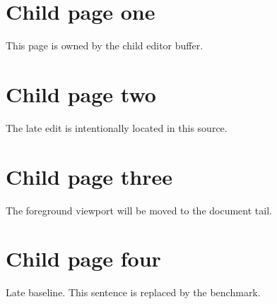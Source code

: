 \section*{Child page one}
This page is owned by the child editor buffer.

\newpage
\section*{Child page two}
The late edit is intentionally located in this source.

\newpage
\section*{Child page three}
The foreground viewport will be moved to the document tail.

\newpage
\section*{Child page four}
Late baseline. This sentence is replaced by the benchmark.
